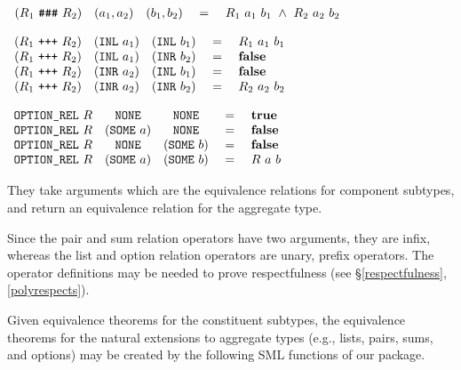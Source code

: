 \documentclass[envcountsame,runningheads]{llncs}
\begin{document}
\begin{definition}
\label{pairrel}
$\begin{array}[t]{lcccl}
(R_1\ \mbox{\tt \#\#\#}\ R_2) & (a_1, a_2) & (b_1, b_2) & \ = \
   & R_1\ a_1\ b_1 \ \wedge \ R_2\ a_2\ b_2
\end{array}$
\end{definition}

\begin{definition}
\label{sumrel}
$\begin{array}[t]{lcccl}
(R_1\ \mbox{\tt +++}\ R_2) & (\mbox{\tt INL}\ a_1) & (\mbox{\tt INL}\ b_1) & \ = \
   & R_1\ a_1\ b_1  \\
(R_1\ \mbox{\tt +++}\ R_2) & (\mbox{\tt INL}\ a_1) & (\mbox{\tt INR}\ b_2) & \ = \
   & \mbox{\bf false}  \\
(R_1\ \mbox{\tt +++}\ R_2) & (\mbox{\tt INR}\ a_2) & (\mbox{\tt INL}\ b_1) & \ = \
   & \mbox{\bf false}  \\
(R_1\ \mbox{\tt +++}\ R_2) & (\mbox{\tt INR}\ a_2) & (\mbox{\tt INR}\ b_2) & \ = \
   & R_2\ a_2\ b_2
\end{array}$
\end{definition}

\begin{definition}
\label{optionrel}
$\begin{array}[t]{lcccl}
\mbox{\tt OPTION\_REL}\ R & \mbox{\tt NONE} & \mbox{\tt NONE} & \ = \
   & \mbox{\bf true}  \\
\mbox{\tt OPTION\_REL}\ R & (\mbox{\tt SOME}\ a) & \mbox{\tt NONE} & \ = \
   & \mbox{\bf false}  \\
\mbox{\tt OPTION\_REL}\ R & \mbox{\tt NONE} & (\mbox{\tt SOME}\ b) & \ = \
   & \mbox{\bf false}  \\
\mbox{\tt OPTION\_REL}\ R & (\mbox{\tt SOME}\ a) & (\mbox{\tt SOME}\ b) & \ = \
   & R\ a\ b
\end{array}$
\end{definition}

They
take
arguments which are the
equivalence relations for component subtypes, and return
an equivalence relation for the aggregate type.

Since the pair and sum relation operators have two arguments,
they are infix, whereas the list and option relation operators
are unary, prefix operators.
The operator definitions
may be needed to prove respectfulness
(see \S \ref{respectfulness}, \ref{polyrespects}).

Given equivalence theorems for the constituent subtypes, the
equivalence theorems for the natural extensions to aggregate types (e.g.,
lists, pairs, sums, and options) may be created by the following
SML functions of our package.
\end{document}

